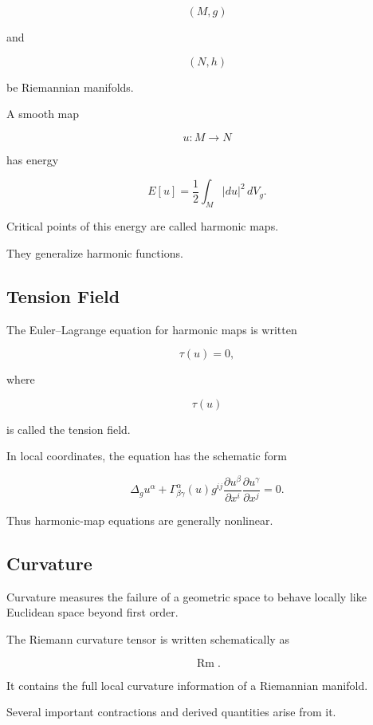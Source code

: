 \[
(M,g)
\]

and

\[
(N,h)
\]

be Riemannian manifolds.

A smooth map

\[
u:M\to N
\]

has energy

\[
\boxed{
E[u]
=
\frac12
\int_M
|du|^2
\,dV_g.
}
\]

Critical points of this energy are called harmonic maps.

They generalize harmonic functions.

\subsection{Tension Field}
\label{subsec:tension-field}

The Euler--Lagrange equation for harmonic maps is written

\[
\boxed{
\tau(u)=0,
}
\]

where

\[
\tau(u)
\]

is called the tension field.

In local coordinates, the equation has the schematic form

\[
\boxed{
\Delta_g u^\alpha
+
\Gamma^\alpha_{\beta\gamma}(u)
g^{ij}
\frac{\partial u^\beta}{\partial x^i}
\frac{\partial u^\gamma}{\partial x^j}
=
0.
}
\]

Thus harmonic-map equations are generally nonlinear.

\subsection{Curvature}
\label{subsec:geometric-analysis-curvature}

Curvature measures the failure of a geometric space to behave locally
like Euclidean space beyond first order.

The Riemann curvature tensor is written schematically as

\[
\boxed{
\operatorname{Rm}.
}
\]

It contains the full local curvature information of a Riemannian
manifold.

Several important contractions and derived quantities arise from it.

